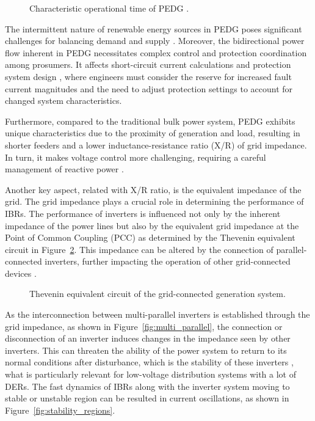 \begin{figure}[ht]
    \caption{Characteristic operational time of PEDG \autocite{misc_karawita_2024}.}\label{fig:pedg_time}
\end{figure}

The intermittent nature of renewable energy sources in PEDG poses significant challenges for balancing demand and supply \autocite{7790991,7442160}. Moreover, the bidirectional power flow inherent in PEDG necessitates complex control and protection coordination among prosumers. It affects short-circuit current calculations and protection system design \autocite{4112346}, where engineers must consider the reserve for increased fault current magnitudes and the need to adjust protection settings to account for changed system characteristics. 

Furthermore, compared to the traditional bulk power system, PEDG exhibits unique characteristics due to the proximity of generation and load, resulting in shorter feeders and a lower inductance-resistance ratio (X/R) of grid impedance. In turn, it makes voltage control more challenging, requiring a careful management of reactive power \autocite{7749289}. 

Another key aspect, related with X/R ratio, is the equivalent impedance of the grid. The grid impedance plays a crucial role in determining the performance of IBRs. The performance of inverters is influenced not only by the inherent impedance of the power lines but also by the equivalent grid impedance at the Point of Common Coupling (PCC) as determined by the Thevenin equivalent circuit in Figure~\cref{fig:thevenin}. This impedance can be altered by the connection of parallel-connected inverters, further impacting the operation of other grid-connected devices \autocite{Jayasinghe2021}.


\begin{figure}[ht]
    \caption{Thevenin equivalent circuit of the grid-connected generation system.}\label{fig:thevenin}
\end{figure}

As the interconnection between multi-parallel inverters is established through the grid impedance, as shown in Figure~\cref{fig:multi_parallel}, the connection or disconnection of an inverter induces changes in the impedance seen by other inverters. This can threaten the ability of the power system to return to its normal conditions after disturbance, which is the stability of these inverters \autocite{10615092}, what is particularly relevant for low-voltage distribution systems with a lot of DERs. The fast dynamics of IBRs along with the inverter system moving to stable or unstable region can be resulted in current oscillations, as shown in Figure~\cref{fig:stability_regions}.

